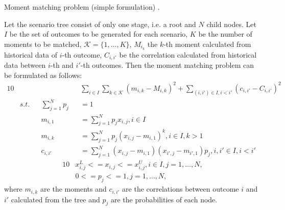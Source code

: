 \begin{defn}{Moment matching problem (simple formulation) \cite[p. 9]{moment_matching_agarwal}.}

Let the scenario tree consist of only one stage, i.e. a root and $N$ child nodes. Let $I$ be the set of outcomes to be generated for each scenario, $K$ be the number of moments to be matched, $\mathcal{K}=\{1,\dots,K\}$, $M_{i_k}$ the $k$-th moment calculated from historical data of $i$-th outcome, $C_{i,i'}$ be the correlation calculated from historical data between $i$-th and $i'$-th outcomes. Then the moment matching problem can be formulated as follows:
\begin{alignat}{10}
& && && \sum_{i\in I} \sum_{k\in \mathcal{K}} \left(m_{i,k} - M_{i,k}\right)^2 + \sum_{(i, i') \in I, i < i'}(c_{i,i'}-C_{i,i'})^2 \nonumber \\
& s.t. && \sum_{j=1}^N p_j&&=1 \nonumber \\
& && m_{i,1}&&=\sum_{j=1}^N p_jx_{i,j}, i \in I \nonumber \\
& && m_{i,k}&&=\sum_{j=1}^N p_j(x_{i,j}-m_{i,1})^k, i \in I, k>1 \nonumber \\
& && c_{i,i'}&&=\sum_{j=1}^N(x_{i,j}-m_{i,1})(x_{i',j}-m_{i',1})p_j, i,i' \in I, i<i' \nonumber
\end{alignat}
\vspace{-0.5cm}
\begin{alignat}{10}
& x_{i,j}^L<=x_{i,j}<=x_{i,j}^U, i \in I, j=1,\dots,N, \nonumber \\
& 0 <= p_j <= 1, j=1,\dots,N, \nonumber
\end{alignat}
where $m_{i,k}$ are the moments and $c_{i,i'}$ are the correlations between outcome $i$ and $i'$ calculated from the tree and $p_j$ are the probabilities of each node.
\end{defn}


